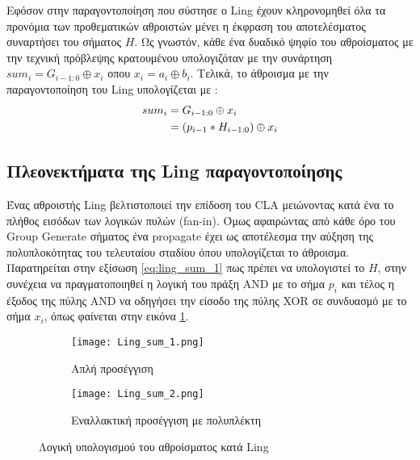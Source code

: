 Εφόσον στην παραγοντοποίηση που σύστησε ο Ling έχουν κληρονομηθεί όλα τα προνόμια 
των προθεματικών αθροιστών μένει η έκφραση του αποτελέσματος συναρτήσει του σήματος $H$.
Ως γνωστόν, κάθε ένα δυαδικό ψηφίο του αθροίσματος με την τεχνική πρόβλεψης κρατουμένου 
υπολογιζόταν με την συνάρτηση $sum_i = G_{i-1:0} \oplus x_i $ οπου $x_i = a_i \oplus b_i$.
Τελικά, το άθροισμα με την παραγοντοποίηση του Ling υπολογίζεται με :
\begin{equation}
\label{eq:ling_sum_1}
\equationame{άθροισμα κατά Ling}
\begin{split}
    sum_i &= G_{i-1:0} \oplus x_i \\
          &= (p_{i-1} * H_{i-1:0}) \oplus x_i
\end{split}
\end{equation}












\subsection{Πλεονεκτήματα της Ling παραγοντοποίησης}
Ένας αθροιστής Ling βελτιστοποιεί την επίδοση του CLA μειώνοντας κατά ένα το πλήθος 
εισόδων των λογικών πυλών (fan-in). Όμως αφαιρώντας από κάθε όρο του Group Generate 
σήματος ένα propagate έχει ως αποτέλεσμα την αύξηση της πολυπλοκότητας του τελευταίου 
σταδίου όπου υπολογίζεται το άθροισμα. 
Παρατηρείται στην εξίσωση \ref{eq:ling_sum_1} πως πρέπει να υπολογιστεί το $H$, 
στην συνέχεια να πραγματοποιηθεί η λογική του πράξη AND με το σήμα $p_i$ και τέλος
η έξοδος της πύλης AND να οδηγήσει την είσοδο της πύλης XOR σε συνδυασμό με το
σήμα $x_i$, όπως φαίνεται στην εικόνα \ref{fig:Ling_sum_1}.

\begin{figure}[H]
    \centering
    \begin{subfigure}{.4\textwidth}
        \centering
        \texttt{[image: Ling\_sum\_1.png]}
        \caption{Απλή προσέγγιση}
        \label{fig:Ling_sum_1}
    \end{subfigure}
    \begin{subfigure}{.4\textwidth}
        \centering
        \texttt{[image: Ling\_sum\_2.png]}
        \caption{Εναλλακτική προσέγγιση με πολυπλέκτη}
        \label{fig:Ling_sum_2}
    \end{subfigure}
    \caption{Λογική υπολογισμού του αθροίσματος κατά Ling}
    \label{fig:Ling_sum}
\end{figure}


